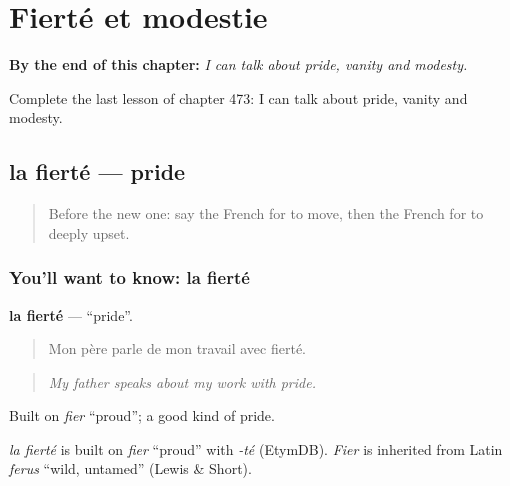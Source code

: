 
\chapter{Fierté et modestie}
\label{ch:fr-fierte-et-modestie}

\begin{chapteropening}
\textbf{By the end of this chapter:} \emph{I can talk about pride, vanity and modesty.}

Complete the last lesson of chapter 473: I can talk about pride, vanity and modesty.
\end{chapteropening}

\section[la fierté]{la fierté — pride}

\label{lesson:FR-C473-fierte}



\begin{quote}
Before the new one: say the French for to move, then the French for to deeply upset.
\end{quote}

\subsection*{You'll want to know: la fierté}
\textbf{la fierté} — \textquotedblleft{}pride\textquotedblright{}.

\begin{quote}
Mon père parle de mon travail avec fierté.
\end{quote}

\begin{quote}
\emph{My father speaks about my work with pride.}
\end{quote}

Built on \emph{fier} \textquotedblleft{}proud\textquotedblright{}; a good kind of pride.

\begin{cousinweb}
\emph{la fierté} is built on \emph{fier} \textquotedblleft{}proud\textquotedblright{} with \emph{-té} (EtymDB). \emph{Fier} is inherited from Latin \emph{ferus} \textquotedblleft{}wild, untamed\textquotedblright{} (Lewis \& Short).
\end{cousinweb}

